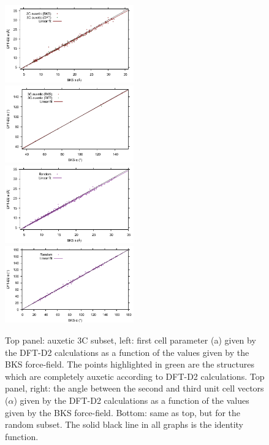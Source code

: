 \documentclass[journal=jacsat,manuscript=article]{achemso}
\begin{document}
\begin{figure}[ht!]\centering
\includegraphics[clip,trim=0.05cm 0.05cm 0.25cm 0.25cm,width=0.495\textwidth]{zeolite_study_4_1}
\includegraphics[clip,trim=0.05cm 0.05cm 0.25cm 0.25cm,width=0.495\textwidth]{zeolite_study_4_2}
\includegraphics[clip,trim=0.05cm 0.05cm 0.25cm 0.25cm,width=0.495\textwidth]{zeolite_study_4_3}
\includegraphics[clip,trim=0.05cm 0.05cm 0.25cm 0.25cm,width=0.495\textwidth]{zeolite_study_4_4}
\caption{Top panel: auxetic 3C subset, left: first cell parameter (a) given by the DFT-D2 calculations as a function of the values given by the BKS force-field. The points highlighted in green are the structures which are completely auxetic according to DFT-D2 calculations. Top panel, right: the angle between the second and third unit cell vectors ($\alpha$) given by the DFT-D2 calculations as a function of the values given by the BKS force-field. Bottom: same as top, but for the random subset. The solid black line in all graphs is the identity function.
\label{corr_A}}
\end{figure}
\end{document}
